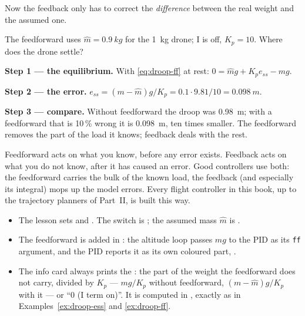 Now the feedback only has to correct the \emph{difference} between the real weight and the assumed one.

\begin{example}
\label{ex:droop-ff}
The feedforward uses $\hat m = \SI{0.9}{kg}$ for the \SI{1}{kg} drone; I is off, $K_p = 10$. Where does the drone settle?

\textbf{Step 1 — the equilibrium.} With \cref{eq:droop-ff} at rest: $0 = \hat m g + K_p e_{ss} - m g$.

\textbf{Step 2 — the error.} $e_{ss} = (m - \hat m)g/K_p = 0.1 \cdot 9.81/10 = \SI{0.098}{m}$.

\textbf{Step 3 — compare.} Without feedforward the droop was \SI{0.98}{m}; with a feedforward that is 10\,\% wrong it is \SI{0.098}{m}, ten times smaller. The feedforward removes the part of the load it knows; feedback deals with the rest.
\end{example}

\begin{keyidea}
Feedforward acts on what you know, before any error exists. Feedback acts on what you do not know, after it has caused an error. Good controllers use both: the feedforward carries the bulk of the known load, the feedback (and especially its integral) mops up the model errors. Every flight controller in this book, up to the trajectory planners of Part~II, is built this way.
\end{keyidea}

\begin{inapp}
\begin{itemize}[leftmargin=1.2em]
  \item The lesson sets  and . The switch is ; the assumed mass $\hat m$ is .
  \item The feedforward is added in : the altitude loop passes $\hat m g$ to the PID as its \texttt{ff} argument, and the PID reports it as its own coloured part, \FFt.
  \item The info card always prints the : the part of the weight the feedforward does not carry, divided by $K_p$ — $mg/K_p$ without feedforward, $(m - \hat m)g/K_p$ with it — or \enquote{0 (I term on)}. It is computed in , exactly as in Examples~\ref{ex:droop-ess} and \ref{ex:droop-ff}.
\end{itemize}
\end{inapp}

